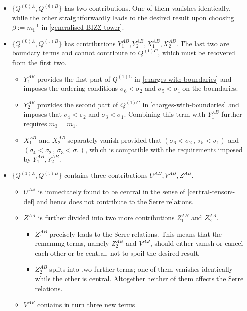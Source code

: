 \documentclass[12pt]{article}
\numberwithin{equation}{section}
\begin{document}
\begin{itemize}
\item $\{Q^{(0)A},Q^{(0)B}\}$ has two contributions. One of them vanishes identically, while the other straightforwardly leads to the desired result upon choosing $\beta:=m_{1}^{-1}$ in \eqref{generalised-BIZZ-tower}.
\item $\{Q^{(0)A},Q^{(1)B}\}$ has contributions $Y_{1}^{AB},Y_{2}^{AB},X_{1}^{AB},X_{2}^{AB}$. The last two are boundary terms and cannot contribute to $Q^{(1)C}$, which must be recovered from the first two.
\begin{itemize}
\item $Y_{1}^{AB}$ provides the first part of $Q^{(1)C}$ in \eqref{charges-with-boundaries} and imposes the ordering conditions $\sigma_{6}<\sigma_{2}$ and $\sigma_{5}<\sigma_{1}$ on the boundaries.
\item $Y_{2}^{AB}$ provides the second part of $Q^{(1)C}$ in \eqref{charges-with-boundaries} and imposes that $\sigma_{4}<\sigma_{2}$ and $ \sigma_{3}<\sigma_{1}$. Combining this term with $Y_{1}^{AB}$ further requires $m_{3}=m_{1}$.
\item $X_{1}^{AB}$ and $X_{2}^{AB}$ separately vanish provided that $(\sigma_{6}<\sigma_{2} \, , \, \sigma_{5}<\sigma_{1})$ and $(\sigma_{4}<\sigma_{2} \, , \, \sigma_{3}<\sigma_{1})$, which is compatible with the requirements imposed by $Y_{1}^{AB},Y_{2}^{AB}$.
\end{itemize}
\item $\{Q^{(1)A},Q^{(1)B}\}$ contains three contributions $U^{AB},V^{AB},Z^{AB}$.
\begin{itemize}
\item $U^{AB}$ is immediately found to be central in the sense of \eqref{central-tensors-def} and hence does not contribute to the Serre relations.
\item $Z^{AB}$ is further divided into two more contributions $Z_{1}^{AB}$ and $Z_{2}^{AB}$.
\begin{itemize}
\item $Z_{1}^{AB}$ precisely leads to the Serre relations. This means that the remaining terms, namely $Z_{2}^{AB}$ and $V^{AB}$, should either vanish or cancel each other or be central, not to spoil the desired result.
\item $Z_{2}^{AB}$ splits into two further terms; one of them vanishes identically while the other is central. Altogether neither of them affects the Serre relations.
\end{itemize}
\item $V^{AB}$ contains in turn three new terms

\end{itemize}
\end{itemize}
\end{document}
